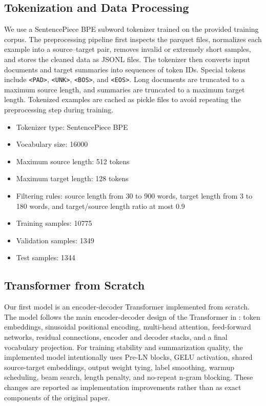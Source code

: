 \documentclass[conference]{IEEEtran}
\begin{document}
\subsection{Tokenization and Data Processing}
We use a SentencePiece BPE subword tokenizer trained on the provided training corpus. The preprocessing pipeline first inspects the parquet files, normalizes each example into a source--target pair, removes invalid or extremely short samples, and stores the cleaned data as JSONL files. The tokenizer then converts input documents and target summaries into sequences of token IDs. Special tokens include \texttt{<PAD>}, \texttt{<UNK>}, \texttt{<BOS>}, and \texttt{<EOS>}. Long documents are truncated to a maximum source length, and summaries are truncated to a maximum target length. Tokenized examples are cached as pickle files to avoid repeating the preprocessing step during training.

\begin{itemize}
    \item Tokenizer type: SentencePiece BPE
    \item Vocabulary size: 16000
    \item Maximum source length: 512 tokens
    \item Maximum target length: 128 tokens
    \item Filtering rules: source length from 30 to 900 words, target length from 3 to 180 words, and target/source length ratio at most 0.9
    \item Training samples: 10775
    \item Validation samples: 1349
    \item Test samples: 1344
\end{itemize}

\subsection{Transformer from Scratch}
Our first model is an encoder-decoder Transformer implemented from scratch. The model follows the main encoder-decoder design of the Transformer in \cite{vaswani2017attention}: token embeddings, sinusoidal positional encoding, multi-head attention, feed-forward networks, residual connections, encoder and decoder stacks, and a final vocabulary projection. For training stability and summarization quality, the implemented model intentionally uses Pre-LN blocks, GELU activation, shared source-target embeddings, output weight tying, label smoothing, warmup scheduling, beam search, length penalty, and no-repeat n-gram blocking. These changes are reported as implementation improvements rather than as exact components of the original paper.
\end{document}
